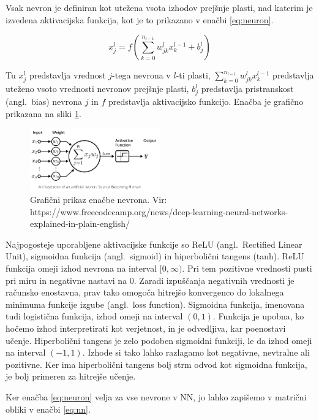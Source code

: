 \documentclass[a4paper, 12pt, openright]{book}
\newcommand{\en}{angl.}
\begin{document}
Vsak nevron je definiran kot utežena vsota izhodov prejšnje plasti, nad katerim je izvedena aktivacijska funkcija, kot je to prikazano v enačbi \ref{eq:neuron}.

\begin{equation}
\label{eq:neuron}
    x_{j}^{l} = f\left(\sum_{k=0}^{n_{l-1}}w_{jk}^{l}x_{k}^{l-1} + b_{j}^{l}\right)
\end{equation}

Tu $ x_{j}^{l} $ predstavlja vrednost $ j $-tega nevrona v $ l $-ti plasti, $ \sum_{k=0}^{n_{l-1}}w_{jk}^{l}x_{k}^{l-1} $ predstavlja uteženo vsoto vrednosti nevronov prejšnje plasti, $ b_{j}^{l} $ predstavlja pristranskost (\en\ bias) nevrona $ j $ in $ f $ predstavlja aktivacijsko funkcijo.
Enačba je grafično prikazana na sliki \ref{fig:neuron}.

\begin{figure}
    \centering
    \includegraphics[width=0.5\textwidth]{activation-function.png}
    \caption{Grafični prikaz enačbe nevrona. Vir: https://www.freecodecamp.org/news/deep-learning-neural-networks-explained-in-plain-english/}
    \label{fig:neuron}
\end{figure}

Najpogosteje uporabljene aktivacijske funkcije so ReLU (\en\ Rectified Linear Unit), sigmoidna funkcija (\en\ sigmoid) in hiperbolični tangens (tanh).
ReLU funkcija omeji izhod nevrona na interval $ [0, \infty) $.
Pri tem pozitivne vrednosti pusti pri miru in negativne nastavi na 0.
Zaradi izpuščanja negativnih vrednosti je računsko enostavna, prav tako omogoča hitrejšo konvergenco do lokalnega minimuma funkcije izgube (\en\ loss function).
Sigmoidna funkcija, imenovana tudi logistična funkcija, izhod omeji na interval $ (0, 1) $.
Funkcija je upobna, ko hočemo izhod interpretirati kot verjetnost, in je odvedljiva, kar poenostavi učenje.
Hiperbolični tangens je zelo podoben sigmoidni funkciji, le da izhod omeji na interval $ (-1, 1) $.
Izhode si tako lahko razlagamo kot negativne, nevtralne ali pozitivne.
Ker ima hiperbolični tangens bolj strm odvod kot sigmoidna funkcija, je bolj primeren za hitrejše učenje.

Ker enačba \ref{eq:neuron} velja za vse nevrone v NN, jo lahko zapišemo v matrični obliki v enačbi \ref{eq:nn}.
\end{document}
